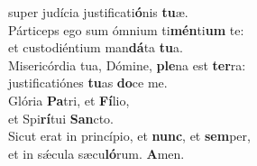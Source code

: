 \evenverse super judícia justificati\textbf{ó}nis \textbf{tu}æ.\\
\oddverse Párticeps ego sum ómnium ti\textbf{mén}ti\textbf{um} te:~\*\\
\oddverse et custodiéntium man\textbf{dá}ta \textbf{tu}a.\\
\evenverse Misericórdia tua, Dómine, \textbf{ple}na est \textbf{ter}ra:~\*\\
\evenverse justificatiónes \textbf{tu}as \textbf{do}ce me.\\
\oddverse Glória \textbf{Pa}tri, et \textbf{Fí}lio,~\*\\
\oddverse et Spi\textbf{rí}tui \textbf{San}cto.\\
\evenverse Sicut erat in princípio, et \textbf{nunc}, et \textbf{sem}per,~\*\\
\evenverse et in sǽcula sæcu\textbf{ló}rum. \textbf{A}men.\\
